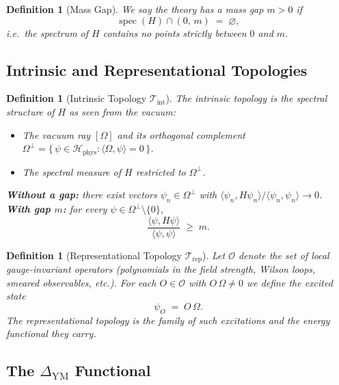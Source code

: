 \documentclass[11pt]{article}
\newtheorem{definition}[theorem]{Definition}
\DeclareMathOperator{\spec}{spec}
\begin{document}
\begin{definition}[Mass Gap]
\label{def:mass-gap}
We say the theory has a \emph{mass gap} $m > 0$ if
\[
  \spec(H) \cap (0,\,m) \;=\; \varnothing ,
\]
i.e.\ the spectrum of $H$ contains no points strictly between $0$ and
$m$.
\end{definition}

\subsection{Intrinsic and Representational Topologies}

\begin{definition}[Intrinsic Topology $\mathcal{T}_{\mathrm{int}}$]
\label{def:T-int}
The \emph{intrinsic topology} is the spectral structure of $H$ as seen
from the vacuum:
\begin{itemize}
\item The vacuum ray $[\Omega]$ and its orthogonal complement
      $\Omega^{\perp}
       = \{\,\psi \in \mathcal{H}_{\mathrm{phys}} :
           \langle \Omega, \psi\rangle = 0\,\}$.
\item The spectral measure of $H$ restricted to $\Omega^{\perp}$.
\end{itemize}
\textbf{Without a gap:} there exist vectors
$\psi_n \in \Omega^{\perp}$ with
$\langle \psi_n, H\psi_n\rangle / \langle \psi_n, \psi_n\rangle
  \to 0$.\\[3pt]
\textbf{With gap $m$:} for every
$\psi \in \Omega^{\perp} \setminus \{0\}$,
\[
  \frac{\langle \psi, H\psi\rangle}{\langle \psi, \psi\rangle}
  \;\geq\; m .
\]
\end{definition}

\begin{definition}[Representational Topology $\mathcal{T}_{\mathrm{rep}}$]
\label{def:T-rep}
Let $\mathcal{O}$ denote the set of \emph{local gauge-invariant
operators} (polynomials in the field strength, Wilson loops, smeared
observables, etc.).  For each $O \in \mathcal{O}$ with
$O\,\Omega \neq 0$ we define the \emph{excited state}
\[
  \psi_O \;=\; O\,\Omega .
\]
The representational topology is the family of such excitations and the
energy functional they carry.
\end{definition}

\subsection{The $\Delta_{\mathrm{YM}}$ Functional}
\end{document}
